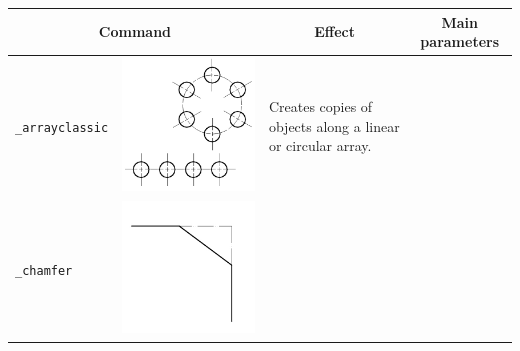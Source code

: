 \documentclass[..]{../IEEEphot}
\begin{document}
\begin{center}
\begin{longtable}{m{.2\linewidth}m{.2\linewidth}m{.25\linewidth}m{.25\linewidth}}
\toprule
    \multicolumn{2}{c}{\bfseries Command} &
    \multicolumn{1}{c}{\bfseries Effect} &
    \multicolumn{1}{c}{\bfseries Main parameters} \\
\midrule
\texttt{\_arrayclassic} & \includegraphics[width = 0.8\linewidth, keepaspectratio]{../images/jpg/_arrayclassic.jpg} & Creates copies of objects along a linear or circular array. & 
\\
\midrule
\texttt{\_chamfer} & \includegraphics[width = 0.8\linewidth, keepaspectratio]{../images/jpg/_chamfer.jpg}  

\end{longtable}
\end{center}
\end{document}

